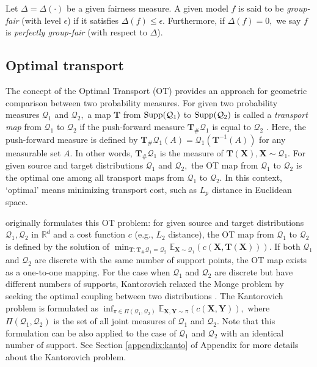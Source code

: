 \documentclass[10pt]{article} %
\begin{document}
Let $\Delta = \Delta (\cdot)$ be a given fairness measure.
A given model $f$ is said to be \textit{group-fair} (with level $\epsilon$) if it satisfies $\Delta (f) \le \epsilon.$
Furthermore, if $\Delta (f) = 0,$  we say $f$ is \textit{perfectly group-fair} (with respect to $\Delta$).


\subsection{Optimal transport}

The concept of the Optimal Transport (OT) provides an approach for geometric comparison between two probability measures.
For given two probability measures $\mathcal{Q}_{1}$ and $\mathcal{Q}_{2},$ a map $\mathbf{T}$ from $\textup{Supp}(\mathcal{Q}_{1})$ to $\textup{Supp}(\mathcal{Q}_{2})$ is called a \textit{transport map} from $\mathcal{Q}_{1}$ to $\mathcal{Q}_{2}$ if the push-forward measure $\mathbf{T}_{\#} \mathcal{Q}_{1}$ is equal to $\mathcal{Q}_{2}$ \citep{villani2008optimal}.
Here, the push-forward measure is defined by $\mathbf{T}_{\#} \mathcal{Q}_{1} (A) = \mathcal{Q}_{1}(\mathbf{T}^{-1}(A))$ for any measurable set $A.$
In other words, $\mathbf{T}_{\#} \mathcal{Q}_{1}$ is the measure of $\mathbf{T}(\mathbf{X}), \mathbf{X} \sim \mathcal{Q}_{1}.$
For given source and target distributions $\mathcal{Q}_{1}$ and $\mathcal{Q}_{2},$ the OT map from $\mathcal{Q}_{1}$ to $\mathcal{Q}_{2}$ is the optimal one among all transport maps from $\mathcal{Q}_{1}$ to $\mathcal{Q}_{2}.$
In this context, `optimal' means minimizing transport cost, such as $L_{p}$ distance in Euclidean space.

\citet{monge1781memoire} originally formulates this OT problem:
for given source and target distributions $\mathcal{Q}_{1}, \mathcal{Q}_{2}$ in $\mathbb{R}^{d}$ and a cost function $c$ (e.g., $L_{2}$ distance), the OT map from $\mathcal{Q}_{1}$ to $\mathcal{Q}_{2}$ is defined by the solution of
$\min_{ \mathbf{T}: \mathbf{T}_{\#} \mathcal{Q}_{1} = \mathcal{Q}_{2} } \mathbb{E}_{ \mathbf{X} \sim \mathcal{Q}_{1} } \left( c \left( \mathbf{X}, \mathbf{T} ( \mathbf{X} ) \right) \right).$
If both $\mathcal{Q}_{1}$ and $\mathcal{Q}_{2}$ are discrete with the same number of support points, the OT map exists as a one-to-one mapping.
For the case when $\mathcal{Q}_{1}$ and $\mathcal{Q}_{2}$ are discrete but have different numbers of supports, Kantorovich relaxed the Monge problem by seeking the optimal coupling between two distributions \citep{Kantorovich2006OnTT}.
The Kantorovich problem is formulated as
$\inf_{\pi \in \Pi(\mathcal{Q}_{1}, \mathcal{Q}_{2})} \mathbb{E}_{\mathbf{X}, \mathbf{Y} \sim \pi} \left( c(\mathbf{X}, \mathbf{Y}) \right),$
where $\Pi(\mathcal{Q}_{1}, \mathcal{Q}_{2})$ is the set of all joint measures of $\mathcal{Q}_{1}$ and $\mathcal{Q}_{2}.$
Note that this formulation can be also applied to the case of $\mathcal{Q}_{1}$ and $\mathcal{Q}_{2}$ with an identical number of support.
See Section \ref{appendix:kanto} of Appendix for more details about the Kantorovich problem.
\end{document}
